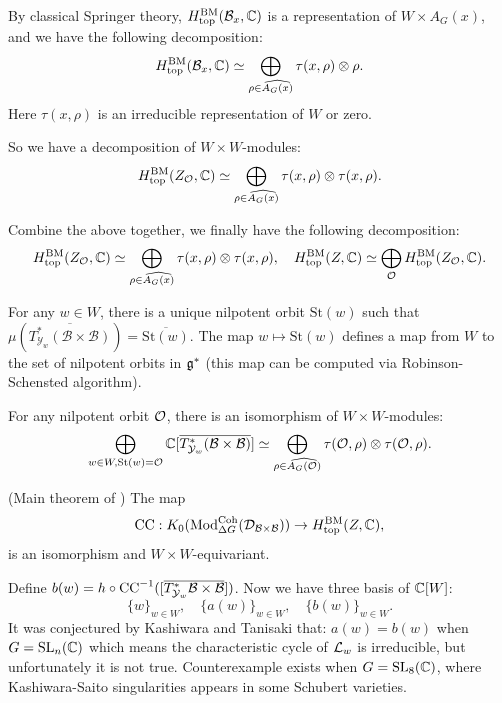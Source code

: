 By classical Springer theory, $H^{\mathrm{BM}}_{\mathrm{top}}(\mathcal{B}_x,\mathbb{C})$ is a representation of $W \times A_G(x)$, and we have the following decomposition:
\[H^{\mathrm{BM}}_{\mathrm{top}}(\mathcal{B}_x,\mathbb{C}) \simeq \bigoplus_{\rho \in \widehat{A_G(x)}} \tau(x,\rho) \otimes \rho.\]
Here $\tau(x,\rho)$ is an irreducible representation of $W$ or zero.

So we have a decomposition of $W \times W$-modules:
\[H^{\mathrm{BM}}_{\mathrm{top}}(Z_{\mathcal{O}},\mathbb{C}) \simeq \bigoplus_{\rho \in \widehat{A_G(x)}} \tau(x,\rho) \otimes \tau(x,\rho).\]

Combine the above together, we finally have the following decomposition:
\[
  H^{\mathrm{BM}}_{\mathrm{top}}(Z_{\mathcal{O}},\mathbb{C}) \simeq \bigoplus_{\rho \in \widehat{A_G(x)}} \tau(x,\rho) \otimes \tau(x,\rho), \quad H_{\mathrm{top}}^{\mathrm{BM}}(Z,\mathbb{C}) \simeq \bigoplus_{\mathcal{O}} H^{\mathrm{BM}}_{\mathrm{top}}(Z_{\mathcal{O}},\mathbb{C}).
\]

For any $w \in W$, there is a unique nilpotent orbit $\mathrm{St}(w)$ such that $\mu(\overline{T^*_{\mathcal{Y}_w}(\mathcal{B} \times \mathcal{B})}) = \overline{\mathrm{St}(w)}$. The map $w \mapsto \mathrm{St}(w)$ defines a  map from $W$ to the set of nilpotent orbits in $\mathfrak{g}^*$ (this map can be computed via Robinson-Schensted algorithm).

\begin{cor}
  For any nilpotent orbit $\mathcal{O}$, there is an isomorphism of $W \times W$-modules:
  \[
    \bigoplus\limits_{w \in W, \mathrm{St}(w) = \mathcal{O}} \mathbb{C}[\overline{T^*_{\mathcal{Y}_w}(\mathcal{B} \times \mathcal{B})}] \simeq \bigoplus\limits_{\rho \in \widehat{A_G(\mathcal{O})}} \tau(\mathcal{O},\rho) \otimes \tau(\mathcal{O},\rho).
  \]
\end{cor}

\begin{thm}(Main theorem of \cite{KT84}) The map
\[
\mathrm{CC} : K_0(\mathrm{Mod}^{\operatorname{Coh}}_{\Delta G}(\mathcal{D}_{\mathcal{B} \times \mathcal{B}})) \to H_{\mathrm{top}}^{\mathrm{BM}}(Z,\mathbb{C}),
\]
is an isomorphism and $W \times W$-equivariant.
\end{thm}




Define $b(w) = h \circ \mathrm{CC}^{-1}([\overline{T^*_{\mathcal{Y}_w}\mathcal{B} \times \mathcal{B}}])$.
Now we have three basis of $\mathbb{C}[W]$:
\[\{w\}_{w \in W}, \quad \{a(w)\}_{w \in W}, \quad \{b(w)\}_{w \in W}.\]
It was conjectured by Kashiwara and Tanisaki that: $a(w) = b(w)$ when $G = \operatorname{SL}_n(\mathbb{C})$ which means the characteristic cycle of $\mathcal{L}_w$ is irreducible, but unfortunately it is not true. Counterexample exists when $G = \operatorname{SL}_8(\mathbb{C})$, where Kashiwara-Saito singularities appears in some Schubert varieties.




